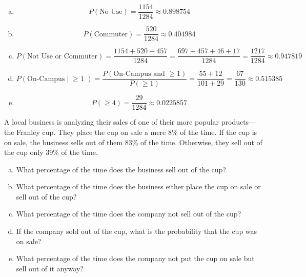 \documentclass[11pt,letterpaper]{article}
\begin{document}
\sol 
\begin{enumerate}[(a)]
\item 
	\[
	P(\text{No Use})= \dfrac{1154}{1284} \approx 0.898754
	\] \pspace

\item 
	\[
	P(\text{Commuter})= \dfrac{520}{1284} \approx 0.404984
	\] \pspace

\item 
	\[
	P(\text{Not Use or Commuter})= \dfrac{1154 + 520 - 457}{1284}= \dfrac{697 + 457 + 46 + 17}{1284}= \dfrac{1217}{1284} \approx 0.947819
	\] \pspace

\item 
	\[
	P(\text{On-Campus} \;|\; \text{$\geq$ 1})= \dfrac{P(\text{On-Campus and } \geq 1)}{P(\geq 1)}= \dfrac{55 + 12}{101 + 29}= \dfrac{67}{130} \approx 0.515385
	\] \pspace

\item 
	\[
	P(\geq 4)= \dfrac{29}{1284} \approx 0.0225857
	\]
\end{enumerate}



\newpage



 A local business is analyzing their sales of one of their more popular products---the Franley cup. They place the cup on sale a mere 8\% of the time. If the cup is on sale, the business sells out of them 83\% of the time. Otherwise, they sell out of the cup only 39\% of the time. 
	\begin{enumerate}[(a)]
	\item What percentage of the time does the business sell out of the cup?
	\item What percentage of the time does the business either place the cup on sale or sell out of the cup?
	\item What percentage of the time does the company not sell out of the cup?
	\item If the company sold out of the cup, what is the probability that the cup was on sale?
	\item What percentage of the time does the company not put the cup on sale but sell out of it anyway?
	\end{enumerate} 
\end{document}
